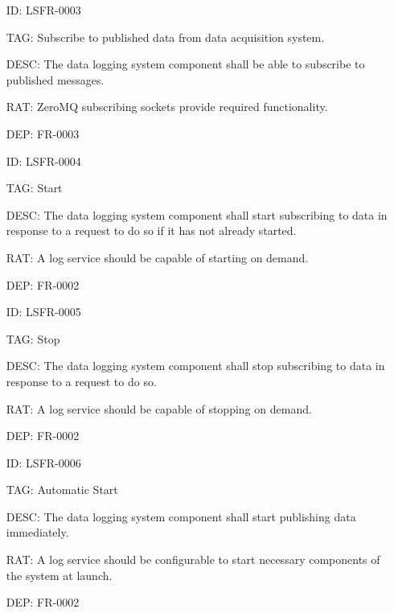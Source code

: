         \begin{itemize}
          \setlength{\itemindent}{.5in}
          \itemsep .15em
          \item[ID:] LSFR-0003
          \item[TAG:] Subscribe to published data from data acquisition system.
          \item[DESC:] The data logging system component shall be able to
            subscribe to published messages.
          \item[RAT:] ZeroMQ subscribing sockets provide required functionality.
          \item[DEP:] FR-0003
        \end{itemize}

        \begin{itemize}
          \setlength{\itemindent}{.5in}
          \itemsep .15em
          \item[ID:] LSFR-0004
          \item[TAG:] Start
          \item[DESC:] The data logging system component shall start
            subscribing to data in response to a request to do so if it has not
            already started.
          \item[RAT:] A log service should be capable of starting on demand.
          \item[DEP:] FR-0002
        \end{itemize}

        \newpage

        \begin{itemize}
          \setlength{\itemindent}{.5in}
          \itemsep .15em
          \item[ID:] LSFR-0005
          \item[TAG:] Stop
          \item[DESC:] The data logging system component shall stop
            subscribing to data in response to a request to do so.
          \item[RAT:] A log service should be capable of stopping on demand.
          \item[DEP:] FR-0002
        \end{itemize}

        \begin{itemize}
          \setlength{\itemindent}{.5in}
          \itemsep .15em
          \item[ID:] LSFR-0006
          \item[TAG:] Automatic Start
          \item[DESC:] The data logging system component shall start
            publishing data immediately.
          \item[RAT:] A log service should be configurable to start necessary
            components of the system at launch.
          \item[DEP:] FR-0002
        \end{itemize}

